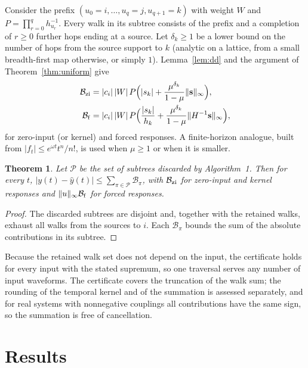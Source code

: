 \documentclass[aps,pra,superscriptaddress,floatfix,longbibliography,twocolumn]{revtex4-2}
\newcommand{\bs}{{\bf s}}
\newtheorem{theorem}{Theorem}
\begin{document}
Consider the prefix $(u_0=i,\dots,u_q=j,u_{q+1}=k)$ with weight $W$ and $P=\prod_{r=0}^{q}h_{u_r}^{-1}$. Every walk in its subtree consists of the prefix and a completion of $r\ge0$ further hops ending at a source. Let $\delta_k\ge1$ be a lower bound on the number of hops from the source support to $k$ (analytic on a lattice, from a small breadth-first map otherwise, or simply $1$). Lemma~\ref{lem:dd} and the argument of Theorem~\ref{thm:uniform} give
\begin{align}
\mathcal{B}_{\rm zi}&=|c_i|\,|W|\,P\Big(|s_k|+\frac{\mu^{\delta_k}}{1-\mu}\|\bs\|_\infty\Big),\label{eq:branch_zi}\\
\mathcal{B}_{\rm f}&=|c_i|\,|W|\,P\Big(\frac{|s_k|}{h_k}+\frac{\mu^{\delta_k}}{1-\mu}\|H^{-1}\bs\|_\infty\Big),\label{eq:branch_f}
\end{align}
for zero-input (or kernel) and forced responses. A finite-horizon analogue, built from $|f_t|\le e^{\omega t}t^n/n!$, is used when $\mu\ge1$ or when it is smaller.

\begin{theorem}\label{thm:certificate}
Let $\mathcal{P}$ be the set of subtrees discarded by Algorithm~1. Then for every $t$, $|y(t)-\hat y(t)|\le\sum_{\pi\in\mathcal{P}}\mathcal{B}_\pi$, with $\mathcal{B}_{\rm zi}$ for zero-input and kernel responses and $\|u\|_\infty\mathcal{B}_{\rm f}$ for forced responses.
\end{theorem}
\begin{proof}
The discarded subtrees are disjoint and, together with the retained walks, exhaust all walks from the sources to $i$. Each $\mathcal{B}_\pi$ bounds the sum of the absolute contributions in its subtree.
\end{proof}
Because the retained walk set does not depend on the input, the certificate holds for every input with the stated supremum, so one traversal serves any number of input waveforms. The certificate covers the truncation of the walk sum; the rounding of the temporal kernel and of the summation is assessed separately, and for real systems with nonnegative couplings all contributions have the same sign, so the summation is free of cancellation.

\section{Results}\label{sec:numerics}
\end{document}
